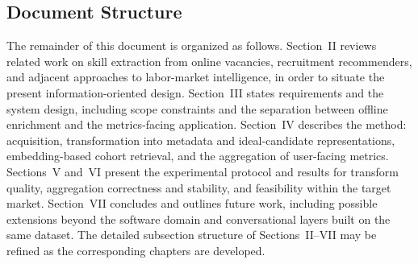 \subsection{Document Structure}
\label{sec:document-structure}

The remainder of this document is organized as follows.
Section~II reviews related work on skill extraction from online vacancies, recruitment recommenders, and adjacent approaches to labor-market intelligence, in order to situate the present information-oriented design.
Section~III states requirements and the system design, including scope constraints and the separation between offline enrichment and the metrics-facing application.
Section~IV describes the method: acquisition, transformation into metadata and ideal-candidate representations, embedding-based cohort retrieval, and the aggregation of user-facing metrics.
Sections~V and~VI present the experimental protocol and results for transform quality, aggregation correctness and stability, and feasibility within the target market.
Section~VII concludes and outlines future work, including possible extensions beyond the software domain and conversational layers built on the same dataset.
The detailed subsection structure of Sections~II--VII may be refined as the corresponding chapters are developed.
